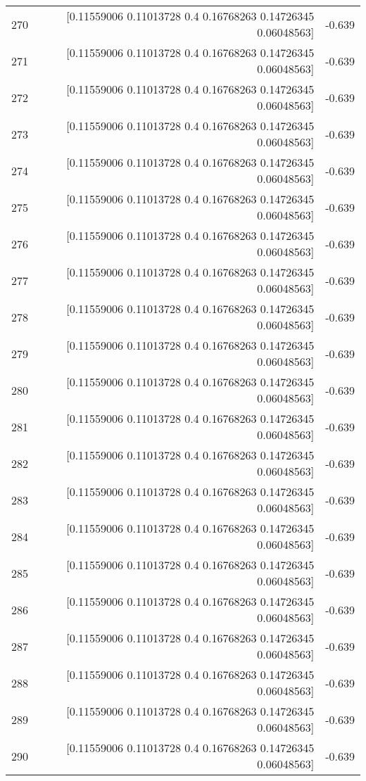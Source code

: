 \begin{longtable}{lrr}
270 & [0.11559006 0.11013728 0.4        0.16768263 0.14726345 0.06048563] & -0.639 \\
271 & [0.11559006 0.11013728 0.4        0.16768263 0.14726345 0.06048563] & -0.639 \\
272 & [0.11559006 0.11013728 0.4        0.16768263 0.14726345 0.06048563] & -0.639 \\
273 & [0.11559006 0.11013728 0.4        0.16768263 0.14726345 0.06048563] & -0.639 \\
274 & [0.11559006 0.11013728 0.4        0.16768263 0.14726345 0.06048563] & -0.639 \\
275 & [0.11559006 0.11013728 0.4        0.16768263 0.14726345 0.06048563] & -0.639 \\
276 & [0.11559006 0.11013728 0.4        0.16768263 0.14726345 0.06048563] & -0.639 \\
277 & [0.11559006 0.11013728 0.4        0.16768263 0.14726345 0.06048563] & -0.639 \\
278 & [0.11559006 0.11013728 0.4        0.16768263 0.14726345 0.06048563] & -0.639 \\
279 & [0.11559006 0.11013728 0.4        0.16768263 0.14726345 0.06048563] & -0.639 \\
280 & [0.11559006 0.11013728 0.4        0.16768263 0.14726345 0.06048563] & -0.639 \\
281 & [0.11559006 0.11013728 0.4        0.16768263 0.14726345 0.06048563] & -0.639 \\
282 & [0.11559006 0.11013728 0.4        0.16768263 0.14726345 0.06048563] & -0.639 \\
283 & [0.11559006 0.11013728 0.4        0.16768263 0.14726345 0.06048563] & -0.639 \\
284 & [0.11559006 0.11013728 0.4        0.16768263 0.14726345 0.06048563] & -0.639 \\
285 & [0.11559006 0.11013728 0.4        0.16768263 0.14726345 0.06048563] & -0.639 \\
286 & [0.11559006 0.11013728 0.4        0.16768263 0.14726345 0.06048563] & -0.639 \\
287 & [0.11559006 0.11013728 0.4        0.16768263 0.14726345 0.06048563] & -0.639 \\
288 & [0.11559006 0.11013728 0.4        0.16768263 0.14726345 0.06048563] & -0.639 \\
289 & [0.11559006 0.11013728 0.4        0.16768263 0.14726345 0.06048563] & -0.639 \\
290 & [0.11559006 0.11013728 0.4        0.16768263 0.14726345 0.06048563] & -0.639 \\

\end{longtable}
